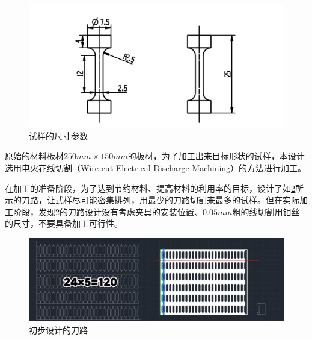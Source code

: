 \begin{figure}[h!]
	\centering
	\includegraphics[width=0.7\linewidth]{pic/试样}
	\caption{试样的尺寸参数}
	\label{fig:试样尺寸}
\end{figure}

原始的材料板材$ 250mm\times 150mm $的板材，为了加工出来目标形状的试样，本设计选用电火花线切割（Wire cut Electrical Discharge Machining）的方法进行加工。

在加工的准备阶段，为了达到节约材料、提高材料的利用率的目标，设计了如\ref{fig:badway}所示的刀路，让式样尽可能密集排列，用最少的刀路切割来最多的试样。但在实际加工阶段，发现\ref{fig:badway}的刀路设计没有考虑夹具的安装位置、$ 0.05mm $粗的线切割用钼丝的尺寸，不要具备加工可行性。
\begin{figure}[h!]
	\centering
	\includegraphics[width=0.8\linewidth]{pic/刀路初步}
	\caption{初步设计的刀路}
	\label{fig:badway}
\end{figure}

